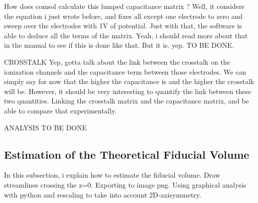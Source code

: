 How does comsol calculate this lumped capacitance matrix ?
Well, it considers the equation i just wrote before, and fixes all except one electrode to zero and sweep over the electrodes with 1V of potential. Just with that, the software is able to deduce all the terms of the matrix.
Yeah, i should read more about that in the manual to see if this is done like that. But it is. yep.
TO BE DONE.


CROSSTALK
Yep, gotta talk about the link between the crosstalk on the ionization channels and the capacitance term between those electrodes.
We can simply say for now that the higher the capacitance is and the higher the crosstalk will be. However, it should be very interesting to quantify the link between these two quantities.
Linking the crosstalk matrix and the capacitance matrix, and be able to compare that experimentally.

ANALYSIS TO BE DONE


\subsection{Estimation of the Theoretical Fiducial Volume}

In this subsection, i explain how to estimate the fiducial volume.
Draw streamlines crossing the z=0.
Exporting to image png.
Using graphical analysis with python and rescaling to take into account 2D-axisymmetry.

